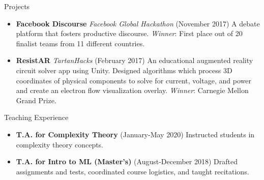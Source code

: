 \documentclass[termes]{resume}
\begin{document}
	\begin{cvsection}{Projects}
		\begin{cvsubsection}{}{}{}
			\begin{itemize}
				\item \textbf{Facebook Discourse} \textit{Facebook Global Hackathon} (November 2017) A debate platform that fosters productive discourse. \textit{Winner}: First place out of 20 finalist teams from 11 different countries.
				\item \textbf{ResistAR} \textit{TartanHacks} (February 2017) An educational augmented reality circuit solver app using Unity. Designed algorithms which process 3D coordinates of physical components to solve for current, voltage, and power and create an electron flow visualization overlay. \textit{Winner}: Carnegie Mellon Grand Prize.
			\end{itemize}
		\end{cvsubsection}
	\end{cvsection}
	
	\begin{cvsection}{Teaching Experience}
		\begin{cvsubsection}{}{}{}	
			\begin{itemize}
				\item \textbf{T.A. for Complexity Theory} (January-May 2020) Instructed students in complexity theory concepts.
				\item \textbf{T.A. for Intro to ML (Master's)} (August-December 2018) Drafted assignments and tests, coordinated course logistics, and taught recitations.
			\end{itemize}
		\end{cvsubsection}
	\end{cvsection}
	
\end{document}
